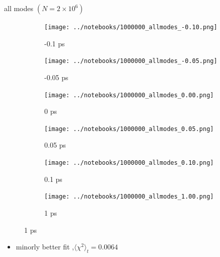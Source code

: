 \documentclass{beamer}
\newcommand\w{0.32}
\begin{document}
\begin{frame}{all modes $(N= 2\times10^6)$}
	\begin{figure}
		\centering
		\begin{subfigure}[b]{\w\textwidth}
			\centering
			\texttt{[image: ../notebooks/1000000\_allmodes\_-0.10.png]}
			\caption{-0.1 ps}
		\end{subfigure}
		\begin{subfigure}[b]{\w\textwidth}
			\centering
			\texttt{[image: ../notebooks/1000000\_allmodes\_-0.05.png]}
			\caption{-0.05 ps}
		\end{subfigure}
		\begin{subfigure}[b]{\w\textwidth}
			\centering
			\texttt{[image: ../notebooks/1000000\_allmodes\_0.00.png]}
			\caption{0 ps}
		\end{subfigure}
		\begin{subfigure}[b]{\w\textwidth}
			\centering
			\texttt{[image: ../notebooks/1000000\_allmodes\_0.05.png]}
			\caption{0.05 ps}
		\end{subfigure}
		\begin{subfigure}[b]{\w\textwidth}
			\centering
			\texttt{[image: ../notebooks/1000000\_allmodes\_0.10.png]}
			\caption{0.1 ps}
		\end{subfigure}
		\begin{subfigure}[b]{\w\textwidth}
			\centering
			\texttt{[image: ../notebooks/1000000\_allmodes\_1.00.png]}
			\caption{1 ps}
		\end{subfigure}
	\end{figure}
	\begin{itemize}
		\item minorly better fit ,$\langle\chi^2\rangle_t = 0.0064$
	\end{itemize}
\end{frame}
\end{document}
